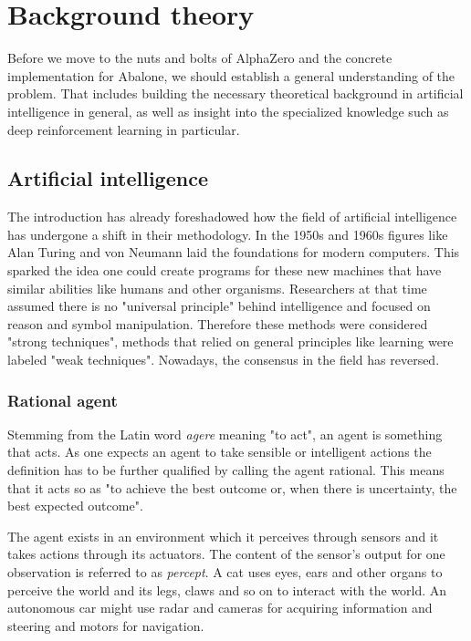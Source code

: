 \chapter{Background theory}
Before we move to the nuts and bolts of AlphaZero and the concrete implementation for Abalone, we should establish a general understanding of the problem. That includes building the necessary theoretical background in artificial intelligence in general, as well as insight into the specialized knowledge such as deep reinforcement learning in particular.

\section{Artificial intelligence}
The introduction has already foreshadowed how the field of artificial intelligence has undergone a shift in their methodology. In the 1950s and 1960s figures like Alan Turing and von Neumann laid the foundations for modern computers. This sparked the idea one could create programs for these new machines that have similar abilities like humans and other organisms. Researchers at that time assumed there is no "universal principle" behind intelligence and focused on reason and symbol manipulation. Therefore these methods were considered "strong techniques", methods that relied on general principles like learning were labeled "weak techniques". Nowadays, the consensus in the field has reversed. \cite[p. 8f.]{sutton_reinforcement_2018}


\subsection{Rational agent}
Stemming from the Latin word \textit{agere} meaning "to act", an agent is something that acts. As one expects an agent to take sensible or intelligent actions the definition has to be further qualified by calling the agent rational. This means that it acts so as "to achieve the best outcome or, when there is uncertainty, the best expected outcome". \cite[p. 36]{russell_artificial_2021}

The agent exists in an environment which it perceives through sensors and it takes actions through its actuators. The content of the sensor's output for one observation is referred to as \textit{percept}. A cat uses eyes, ears and other organs to perceive the world and its legs, claws and so on to interact with the world. An autonomous car might use radar and cameras for acquiring information and steering and motors for navigation.

